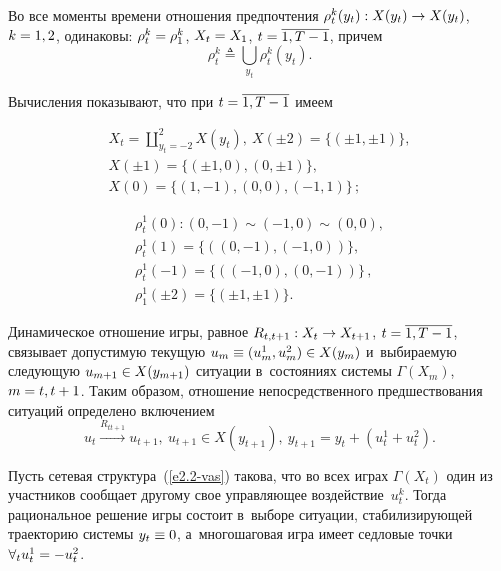 \begin{multicols}{2}
    Во все моменты времени отношения предпочтения $\rho_t^k(y_t): X(y_t) \hm\to 
X(y_t)$, $k\hm=1,2$,  одинаковы: $\rho_t^k \hm= \rho_1^k$, $X_t\hm= X_1$, $t\hm= 
\overline{1,T-1}$, причем
    $$
    \rho_t^k\triangleq \bigcup\limits_{y_t} \rho_t^k (y_t).
    $$

    
    Вычисления показывают, что при $t\hm= \overline{1, T-1}$ имеем
    
    \vspace*{-8pt}
    
    \noindent
    \begin{multline*}
    X_t=\coprod\limits^2_{y_t=-2} X(y_t),\ X(\pm 2) = \{ (\pm 1,\pm1)\},\\
     X(\pm1) = \{ (\pm1,0), (0,\pm1)\},\\
      X(0)=\{ (1,-1), (0,0), (-1,1)\}\,;
    \end{multline*}
    
    \vspace*{-13pt}
    
    \noindent
    \begin{multline*}
    \rho_t^1(0): (0,-1)\sim (-1,0) \sim (0,0),\\
     \rho_t^1(1)=\{ ((0,-1), (-1,0))\},\\
    \rho^1_t(-1) =\{ ((-1,0), (0,-1))\}\,,\\ 
    \rho_1^1(\pm2) =\{ (\pm 1, \pm1)\}.
    \end{multline*}
    
    \vspace*{-4pt}
    
    Динамическое отношение игры, равное $R_{t,t+1}: X_t\hm\to X_{t+1}$, $t\hm= 
\overline{1, T-1}$, связывает до\-пус\-ти\-мую текущую $u_m\hm\equiv (u_m^1, u_m^2) 
\hm\in X(y_m)$ и~выбираемую сле\-ду\-ющую $u_{m+1}\hm\in X(y_{m+1})$ ситуации 
в~состояниях сис\-те\-мы $\Gamma(X_m)$, $m\hm= t, t\hm+1$. Таким образом, 
отношение непосредственного пред\-шест\-во\-ва\-ния ситуаций определено включением
    $$
    u_t \xrightarrow{R_{tt+1}} u_{t+1},\ u_{t+1} \in X(y_{t+1}),\ y_{t+1} \!=\! y_t+\left( 
u_t^1+ u_t^2\right).
    $$
    
    \vspace*{-2pt}
    
    Пусть сетевая структура~(\ref{e2.2-vas}) такова, что во всех играх 
$\Gamma(X_t)$ один из участников сообщает другому свое управ\-ля\-ющее 
воздействие~$u_t^k$. Тогда рациональное решение игры состоит в~выборе 
ситуации, ста\-би\-ли\-зи\-ру\-ющей траекторию сис\-те\-мы $y_t\hm\equiv 0$, а~многошаговая 
игра имеет седловые точки  $\forall_t u_t^1 \hm= -u_t^2$.
    

\end{multicols}
